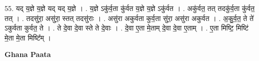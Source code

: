 \documentclass[17pt]{extarticle}
\begin{document}
55. यद् य॒ज्ञे य॒ज्ञे यद् यद् य॒ज्ञे । . य॒ज्ञे ऽकु॑र्व॒ता कु॑र्वत य॒ज्ञे य॒ज्ञे ऽकु॑र्वत । . अकु॑र्वत॒ तत् तदकु॑र्व॒ता कु॑र्वत॒ तत् । . तदसु॑रा॒ असु॑रा॒ स्तत् तदसु॑राः । . असु॑रा अकुर्वता कुर्व॒ता सु॑रा॒ असु॑रा अकुर्वत । . अ॒कु॒र्व॒त॒ ते ते॑ ऽकुर्वता कुर्वत॒ ते । . ते दे॒वा दे॒वा स्ते ते दे॒वाः । . दे॒वा ए॒ता मे॒ताम् दे॒वा दे॒वा ए॒ताम् । . ए॒ता मिष्टि॒ मिष्टि॑ मे॒ता मे॒ता मिष्टि᳚म् । \newline

\textbf{Ghana Paata } \newline
\end{document}
